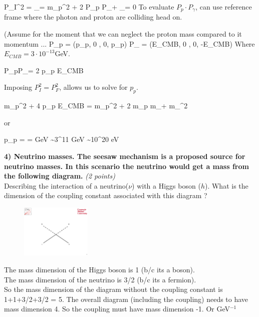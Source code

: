 {\be
P_{I}^2 = _{= m_p^2} + 2 P_p \cdot P_\gamma + _{= 0}
\ee
To evaluate $P_p \cdot P_\gamma$, can use reference frame where the photon and proton are colliding head on.

(Assume for the moment that we can neglect the proton mass compared to it momentum ...
\be
P_{p} = (p_p, 0 , 0, p_p)  \hspace{0.4in} P_{\gamma} = (E_{CMB}, 0 , 0, -E_{CMB})
\ee
Where $E_{CMB} = 3 \cdot 10^{-13} $GeV.

\be
P_p\cdot P_\gamma = 2 p_p E_{CMB} 
\ee

Imposing $P_I^2 = P_F^2$, allows us to solve for $p_p$.

\be
m_p^2 + 4 p_p E_{CMB}  = m_p^2 + 2 m_p  m_\pi + m_\pi^2
\ee

or

\be
p_p =  =  \textrm{GeV} \sim 3^{11} \textrm{GeV} \sim 10^{20} \textrm{eV}
\ee

\vspace*{0.3in}

\textbf{4) Neutrino masses. The seesaw mechanism is a proposed source for neutrino masses. In this scenario the neutrino would get a mass from the following diagram.} \hfill \textit{(2 points)}\\
Describing the interaction of a neutrino($\nu$) with a Higgs boson ($h$).
What is the dimension of the coupling constant associated with this diagram ?

\begin{figure}[h!]
\centering
\includegraphics[width=0.3\textwidth]{./NuMassDiagram.pdf}
\end{figure}

The mass dimension of the Higgs boson is 1 (b/c its a boson).\\
The mass dimension of the neutrino is 3/2 (b/c its a fermion).\\
So the mass dimension of the diagram without the coupling constant is 1+1+3/2+3/2 = 5. 
The overall diagram (including the coupling) needs to have mass dimension 4.  So the coupling must have mass dimension -1.
Or GeV$^{-1}$

}
